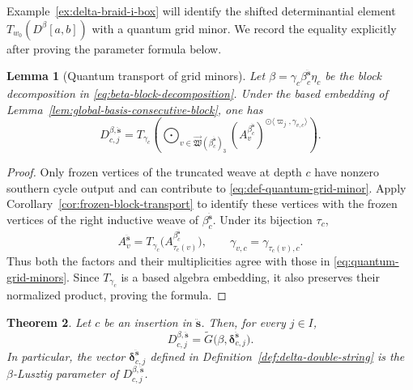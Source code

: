 \documentclass[12pt, reqno]{amsart}
\theoremstyle{plain}
\newtheorem{theorem}{Theorem}[section]
\newtheorem{lemma}[theorem]{Lemma}
\theoremstyle{definition}
\numberwithin{equation}{section}
\begin{document}
Example~\ref{ex:delta-braid-i-box} will identify the shifted
determinantial element \(T_{w_0}(D^\beta[a,b])\) with a quantum
grid minor. We record the equality explicitly after proving the
parameter formula below.
\begin{lemma}[Quantum transport of grid minors]
\label{lem:quantum-grid-minor-transport}
Let
\(
    \beta
    =
    \gamma_c\beta_c^{\ddot{\mathbf s}}\eta_c
\)
be the block decomposition in
\eqref{eq:beta-block-decomposition}. Under the based embedding of
Lemma~\ref{lem:global-basis-consecutive-block}, one has
\begin{equation}\label{eq:quantum-grid-minors}
    D_{c,j}^{\beta,\ddot{\mathbf s}}
    =
    T_{\gamma_c}\left(
        \bigodot_{
            v\in
            \overrightarrow{\mathfrak W}
            (\beta_c^{\ddot{\mathbf s}})_3
        }
        \left(
            A_v^{\beta_c^{\ddot{\mathbf s}}}
        \right)^{
            \odot\langle\varpi_j,\gamma_{v,c}\rangle
        }
    \right).
\end{equation}
\end{lemma}

\begin{proof}
Only frozen vertices of the truncated weave at depth \(c\) have
nonzero southern cycle output and can contribute to
\eqref{eq:def-quantum-grid-minor}. Apply
Corollary~\ref{cor:frozen-block-transport} to identify these vertices
with the frozen vertices of the right inductive weave of
\(\beta_c^{\ddot{\mathbf s}}\). Under its bijection \(\tau_c\),
\[
    A_v^{\ddot{\mathbf s}}
    =T_{\gamma_c}
       \bigl(A_{\tau_c(v)}^{\beta_c^{\ddot{\mathbf s}}}\bigr),
    \qquad
    \gamma_{v,c}=\gamma_{\tau_c(v),c}.
\]
Thus both the factors and their multiplicities agree with those
in \eqref{eq:quantum-grid-minors}. Since \(T_{\gamma_c}\) is a
based algebra embedding, it also preserves their normalized
product, proving the formula.
\end{proof}

\begin{theorem}
\label{thm:quantum-grid-minor-factorization}
Let \(c\) be an insertion in \(\ddot{\mathbf s}\). Then, for
every \(j\in I\),
\begin{equation}
\label{eq:quantum-grid-minor-factorization}
    D_{c,j}^{\beta,\ddot{\mathbf s}}
    =
    \widetilde G\bigl(
        \beta,\boldsymbol\delta_{c,j}^{\ddot{\mathbf s}}
    \bigr).
\end{equation}
In particular, the vector
\(\boldsymbol\delta_{c,j}^{\ddot{\mathbf s}}\) defined in
Definition~\ref{def:delta-double-string} is the
\(\beta\)-Lusztig parameter of
\(D_{c,j}^{\beta,\ddot{\mathbf s}}\).
\end{theorem}
\end{document}
